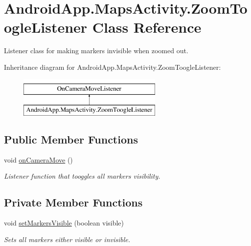 \hypertarget{class_android_app_1_1_maps_activity_1_1_zoom_toogle_listener}{}\section{Android\+App.\+Maps\+Activity.\+Zoom\+Toogle\+Listener Class Reference}
\label{class_android_app_1_1_maps_activity_1_1_zoom_toogle_listener}


Listener class for making markers invisible when zoomed out.  


Inheritance diagram for Android\+App.\+Maps\+Activity.\+Zoom\+Toogle\+Listener\+:\begin{figure}[H]
\begin{center}
\leavevmode
\includegraphics[height=2.000000cm]{class_android_app_1_1_maps_activity_1_1_zoom_toogle_listener}
\end{center}
\end{figure}
\subsection*{Public Member Functions}
\begin{DoxyCompactItemize}
\item 
\mbox{\label{class_android_app_1_1_maps_activity_1_1_zoom_toogle_listener_ade815d6e8093f5020ac4676085f42669}} 
void \hyperlink{class_android_app_1_1_maps_activity_1_1_zoom_toogle_listener_ade815d6e8093f5020ac4676085f42669}{on\+Camera\+Move} ()
\begin{DoxyCompactList}\small\item\em Listener function that tooggles all markers visibility. \end{DoxyCompactList}\end{DoxyCompactItemize}
\subsection*{Private Member Functions}
\begin{DoxyCompactItemize}
\item 
void \hyperlink{class_android_app_1_1_maps_activity_1_1_zoom_toogle_listener_a87b5d78c37a7c1494cb84d613420286f}{set\+Markers\+Visible} (boolean visible)
\begin{DoxyCompactList}\small\item\em Sets all markers either visible or invisible. \end{DoxyCompactList}\end{DoxyCompactItemize}
